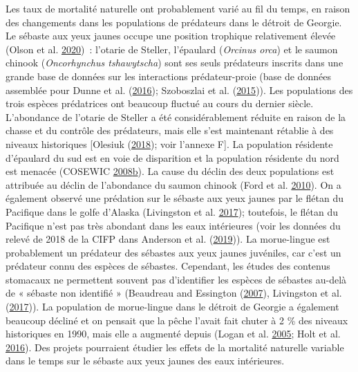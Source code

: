 \documentclass[11pt]{book}
\begin{document}
Les taux de mortalité naturelle ont probablement varié au fil du temps, en raison des changements dans les populations de prédateurs dans le détroit de Georgie. Le sébaste aux yeux jaunes occupe une position trophique relativement élevée (Olson et al. \protect\hyperlink{ref-olson2020}{2020})~: l'otarie de Steller, l'épaulard (\emph{Orcinus orca}) et le saumon chinook (\emph{Oncorhynchus tshawytscha}) sont ses seuls prédateurs inscrits dans une grande base de données sur les interactions prédateur-proie (base de données assemblée pour Dunne et al. (\protect\hyperlink{ref-dunne2016}{2016}); Szoboszlai et al. (\protect\hyperlink{ref-szoboszlai2015}{2015})). Les populations des trois espèces prédatrices ont beaucoup fluctué au cours du dernier siècle. L'abondance de l'otarie de Steller a été considérablement réduite en raison de la chasse et du contrôle des prédateurs, mais elle s'est maintenant rétablie à des niveaux historiques {[}Olesiuk (\protect\hyperlink{ref-olesiuk2018}{2018}); voir l'annexe F{]}. La population résidente d'épaulard du sud est en voie de disparition et la population résidente du nord est menacée (COSEWIC \protect\hyperlink{ref-cosewic2008b}{2008}\protect\hyperlink{ref-cosewic2008b}{b}). La cause du déclin des deux populations est attribuée au déclin de l'abondance du saumon chinook (Ford et al. \protect\hyperlink{ref-ford2010}{2010}). On a également observé une prédation sur le sébaste aux yeux jaunes par le flétan du Pacifique dans le golfe d'Alaska (Livingston et al. \protect\hyperlink{ref-livingston2017}{2017}); toutefois, le flétan du Pacifique n'est pas très abondant dans les eaux intérieures (voir les données du relevé de 2018 de la CIFP dans Anderson et al. (\protect\hyperlink{ref-anderson2019synopsis}{2019})). La morue-lingue est probablement un prédateur des sébastes aux yeux jaunes juvéniles, car c'est un prédateur connu des espèces de sébastes. Cependant, les études des contenus stomacaux ne permettent souvent pas d'identifier les espèces de sébastes au-delà de « sébaste non identifié » (Beaudreau and Essington (\protect\hyperlink{ref-beaudreau2007}{2007}), Livingston et al. (\protect\hyperlink{ref-livingston2017}{2017})). La population de morue-lingue dans le détroit de Georgie a également beaucoup décliné et on pensait que la pêche l'avait fait chuter à 2 \% des niveaux historiques en 1990, mais elle a augmenté depuis (Logan et al. \protect\hyperlink{ref-logan2005}{2005}; Holt et al. \protect\hyperlink{ref-holt2016}{2016}). Des projets pourraient étudier les effets de la mortalité naturelle variable dans le temps sur le sébaste aux yeux jaunes des eaux intérieures.
\end{document}

